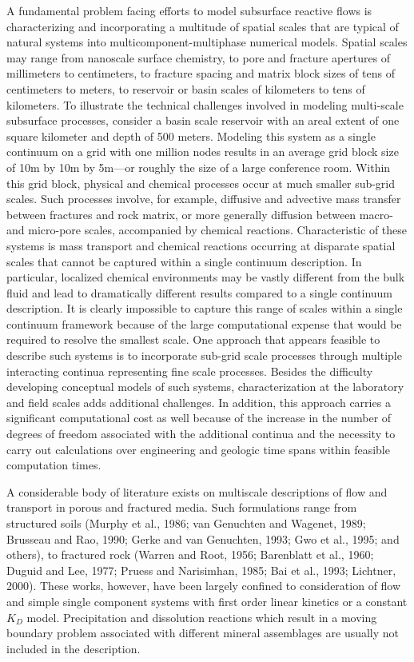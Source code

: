 \documentclass[12pt]{article}
\begin{document}
A fundamental problem facing efforts to model subsurface reactive flows is characterizing and incorporating a multitude of spatial scales that are typical of natural systems into multi\-com\-po\-nent-multiphase numerical models. Spatial scales may range from nanoscale surface chemistry, to pore and fracture apertures of millimeters to centimeters, to fracture spacing and matrix block sizes of tens of centimeters to meters, to reservoir or basin scales of kilometers to tens of kilometers. To illustrate the technical challenges involved in modeling multi-scale subsurface processes, consider a basin scale reservoir with an areal extent of one square kilometer and depth of 500 meters. Modeling this system as a single continuum on a grid with one million nodes results in an average grid block size of 10m by 10m by 5m---or roughly the size of a large conference room. Within this grid block, physical and chemical processes occur at much smaller sub-grid scales. Such processes involve, for example, diffusive and advective mass transfer between fractures and rock matrix, or more generally diffusion between macro- and micro-pore scales, accompanied by chemical reactions. Characteristic of these systems is mass transport and chemical reactions occurring at disparate spatial scales that cannot be captured within a single continuum description. In particular, localized chemical environments may be vastly different from the bulk fluid and lead to dramatically different results compared to a single continuum description. It is clearly impossible to capture this range of scales within a single continuum framework because of the large computational expense that would be required to resolve the smallest scale. One approach that appears feasible to describe such systems is to incorporate sub-grid scale processes through multiple interacting continua representing fine scale processes. Besides the difficulty developing conceptual models of such systems, characterization at the laboratory and field scales adds additional challenges. In addition, this approach carries a significant computational cost as well because of the increase in the number of degrees of freedom associated with the additional continua and the necessity to carry out calculations over engineering and geologic time spans within feasible computation times. 

A considerable body of literature exists on multiscale descriptions of flow and transport in porous and fractured media. Such formulations range from structured soils (Murphy et al., 1986; van Genuchten and Wagenet, 1989; Brusseau and Rao, 1990; Gerke and van Genuchten, 1993; Gwo et al., 1995; and others), to fractured rock (Warren and Root, 1956; Barenblatt et al., 1960; Duguid and Lee, 1977; Pruess and Narisimhan, 1985; Bai et al., 1993; Lichtner, 2000).
These works, however, have been largely confined to consideration of flow and simple single component systems with first order linear kinetics or a constant $K_D$ model.
Precipitation and dissolution reactions which result in a moving boundary problem associated with different mineral assemblages are usually not included in the description. 
\end{document}
